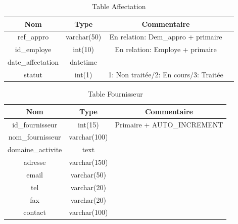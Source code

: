 \documentclass{report}
\begin{document}
\begin{table}[h!]
    \begin{center}
        \begin{tabular}{|c|c|c|c|}
            \hline
            \textbf{Nom} & \textbf{Type} & \textbf{Commentaire}  \\
            \hline
            ref\_appro & varchar(50) & En relation: Dem\_appro + primaire  \\
            \hline
            id\_employe & int(10) & En relation: Employe + primaire \\
            \hline
            date\_affectation & datetime &\\
            \hline
            statut & int(1) & 1: Non traitée/2: En cours/3: Traitée \\
            \hline
        \end{tabular}
    \end{center}
\caption{Table Affectation}
\end{table}

\begin{table}[h!]
    \begin{center}
        \begin{tabular}{|c|c|c|}
            \hline
            \textbf{Nom} & \textbf{Type} & \textbf{Commentaire}  \\
            \hline
            id\_fournisseur & int(15) & Primaire + AUTO\_INCREMENT \\
            \hline
            nom\_fournisseur & varchar(100) &\\
            \hline
            domaine\_activite & text &\\
            \hline
            adresse & varchar(150) &\\
            \hline
            email & varchar(50) &\\
            \hline
            tel & varchar(20) &\\
            \hline
            fax &  varchar(20) &\\
            \hline
            contact & varchar(100) & \\
            \hline
        \end{tabular}
    \end{center}
\caption{Table Fournisseur}
\end{table}
\end{document}

